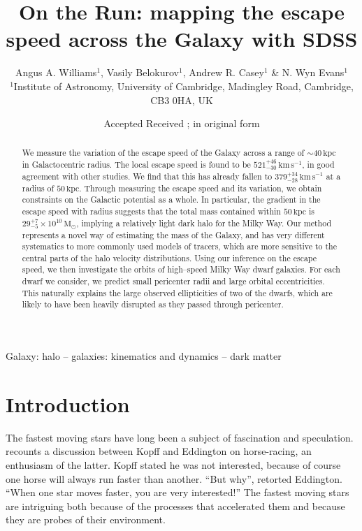\documentclass[useAMS,twocolumn,usenatbib]{mn2e}
\title[Fast moving stars in SDSS] {On the Run: mapping the escape speed across the Galaxy with SDSS}
\author[Williams, Belokurov, Casey \& Evans]{Angus A. Williams$^1$,
  Vasily Belokurov$^1$, Andrew R. Casey$^1$ \& N. Wyn Evans$^1$
  \medskip
  \\$^1$Institute of Astronomy, University of Cambridge, Madingley Road, Cambridge, CB3 0HA, UK}
\def\kpc{{\,\mathrm{kpc}}}
\def\kms{{\,\mathrm{km\,s^{-1}}}}
\def\Msun{{\,\mathrm{M}_\odot}}
\begin{document}
\date{Accepted  Received ; in original form }

\pagerange{\pageref{firstpage}--\pageref{lastpage}} 

\maketitle

\label{firstpage}

\begin{abstract}
We measure the variation of the escape speed of the Galaxy across a range of $\sim 40\kpc$ in Galactocentric radius. 
The local escape speed is found to be $521^{+46}_{-30}\kms$, in good agreement with other studies. 
We find that this has already fallen to $379^{+34}_{-28}\kms$ at a radius of $50\kpc$. 
Through measuring the escape speed and its variation, we obtain constraints on the Galactic potential as a whole. 
In particular, the gradient in the escape speed with radius suggests that the total mass contained within $50\kpc$ is $29^{+7}_{-5}\times10^{10}\Msun$, implying a relatively light dark halo for the Milky Way. 
Our method represents a novel way of estimating the mass of the Galaxy, and has very different systematics to more commonly used models of tracers, which are more sensitive to the central parts of the halo velocity distributions. 
Using our inference on the escape speed, we then investigate the orbits of high--speed Milky Way dwarf galaxies. 
For each dwarf we consider, we predict small pericenter radii and large orbital eccentricities. 
This naturally explains the large observed ellipticities of two of the dwarfs, which are likely to have been heavily disrupted as they passed through pericenter.
\end{abstract}

\begin{keywords}
Galaxy: halo -- galaxies: kinematics and dynamics -- dark matter
\end{keywords}

\section{Introduction}

The fastest moving stars have long been a subject of fascination and speculation. 
\citet{Vi56} recounts a discussion between Kopff and Eddington on horse-racing, an enthusiasm of the latter. 
Kopff stated he was not interested, because of course one horse will always run faster than another.  
``But why'', retorted Eddington. ``When one star moves faster, you are very interested!'' 
The fastest moving stars are intriguing both because of the processes that accelerated them and because they are probes of their environment.
\end{document}
